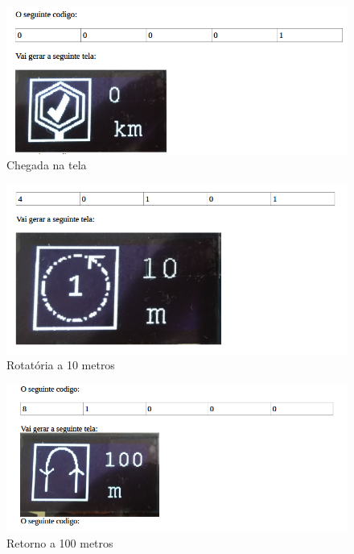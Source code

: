 	
	\begin{figure}[h!]
		\centering
		\includegraphics[scale=0.60]{chegada_led.png}
		\caption{Chegada na tela}
		\label{img:Chegada_led}
	\end{figure}

	
	\begin{figure}[h!]
		\centering
		\includegraphics[scale=0.60]{rotatoria_led.png}
		\caption{Rotatória a 10 metros}
		\label{img:Rotatoria_led}
	\end{figure}
		
	
	\begin{figure}[h!]
		\centering
		\includegraphics[scale=0.60]{retorno_led.png}
		\caption{Retorno a 100 metros}
		\label{img:Retorno_led}
	\end{figure}
	
